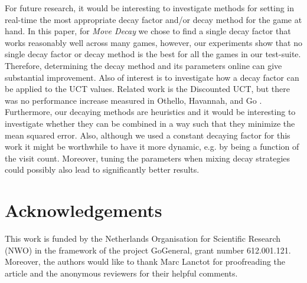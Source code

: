 \documentclass[journal]{IEEEtran}
\begin{document}
For future research, it would be interesting to investigate methods for setting in real-time the most appropriate decay factor and/or decay method for the game at hand. In this paper, for \textit{Move Decay} we chose to find a single decay factor that works reasonably well across many games, however, our experiments show that no single decay factor or decay method is the best for all the games in our test-suite. Therefore, determining the decay method and its parameters online can give substantial improvement. Also of interest is to investigate how a decay factor can be applied to the UCT values. Related work is the Discounted UCT, but there was no performance increase measured in Othello, Havannah, and Go  \cite{acceleratedUCT}. Furthermore, our decaying methods are heuristics and it would be interesting to investigate whether they can be combined in a way such that they minimize the mean squared error. 
Also, although we used a constant decaying factor for this work it might be worthwhile to have it more dynamic, e.g. by being a function of the visit count. Moreover, tuning the parameters when mixing decay strategies could possibly also lead to significantly better results.



\section*{Acknowledgements}
This work is funded by the Netherlands Organisation for Scientific Research (NWO) in the framework of the project GoGeneral, grant number 612.001.121. Moreover, the authors
would like to thank Marc Lanctot for proofreading the article and the anonymous reviewers for their helpful comments. 
\end{document}
